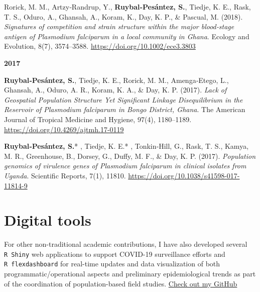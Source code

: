 \documentclass[11pt,a4paper,]{awesome-cv}
\begin{document}
Rorick, M. M., Artzy‐Randrup, Y., \textbf{Ruybal‐Pesántez, S.}, Tiedje,
K. E., Rask, T. S., Oduro, A., Ghansah, A., Koram, K., Day, K. P., \&
Pascual, M. (2018). \emph{Signatures of competition and strain structure
within the major blood‐stage antigen of Plasmodium falciparum in a local
community in Ghana}. Ecology and Evolution, 8(7), 3574--3588.
\url{https://doi.org/10.1002/ece3.3803}

\setlength{\leftskip}{0cm}

\textbf{2017}

\setlength{\leftskip}{1cm}

\textbf{Ruybal‐Pesántez, S.}, Tiedje, K. E., Rorick, M. M.,
Amenga‐Etego, L., Ghansah, A., Oduro, A. R., Koram, K. A., \& Day, K. P.
(2017). \emph{Lack of Geospatial Population Structure Yet Significant
Linkage Disequilibrium in the Reservoir of Plasmodium falciparum in
Bongo District, Ghana}. The American Journal of Tropical Medicine and
Hygiene, 97(4), 1180--1189. \url{https://doi.org/10.4269/ajtmh.17-0119}

\textbf{Ruybal‐Pesántez, S.}* , Tiedje, K. E.* , Tonkin‐Hill, G., Rask,
T. S., Kamya, M. R., Greenhouse, B., Dorsey, G., Duffy, M. F., \& Day,
K. P. (2017). \emph{Population genomics of virulence genes of Plasmodium
falciparum in clinical isolates from Uganda}. Scientific Reports, 7(1),
11810. \url{https://doi.org/10.1038/s41598-017-11814-9}

\setlength{\leftskip}{0cm}

\newpage

\hypertarget{digital-tools}{%
\section{Digital tools}\label{digital-tools}}

\footnotesize

For other non-traditional academic contributions, I have also developed
several \texttt{R\ Shiny} web applications to support COVID-19
surveillance efforts and \texttt{R\ flexdashboard} for real-time updates
and data visualization of both programmatic/operational aspects and
preliminary epidemiological trends as part of the coordination of
population-based field studies.
\href{https://github.com/shaziaruybal}{Check out my GitHub
\faExternalLink}
\end{document}
